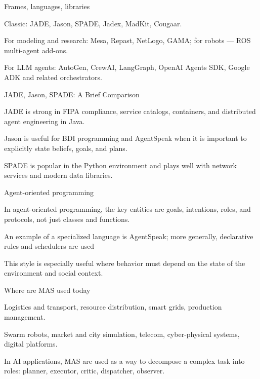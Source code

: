 \begin{frame}{Frames, languages, libraries}
	\topline
	\justifying
	\begin{textitemize}
		\item Classic: JADE, Jason, SPADE, Jadex, MadKit, Cougaar.
		\item For modeling and research: Mesa, Repast, NetLogo, GAMA; for robots --- ROS multi-agent add-ons.
		\item For LLM agents: AutoGen, CrewAI, LangGraph, OpenAI Agents SDK, Google ADK and related orchestrators.
	\end{textitemize}
\end{frame}

\begin{frame}{JADE, Jason, SPADE: A Brief Comparison}
	\topline
	\justifying
	\begin{textitemize}
		\item JADE is strong in FIPA compliance, service catalogs, containers, and distributed agent engineering in Java.
		\item Jason is useful for BDI programming and AgentSpeak when it is important to explicitly state beliefs, goals, and plans.
		\item SPADE is popular in the Python environment and plays well with network services and modern data libraries.
	\end{textitemize}
\end{frame}

\begin{frame}{Agent-oriented programming}
	\topline
	\justifying
	\begin{textitemize}
		\item In agent-oriented programming, the key entities are goals, intentions, roles, and protocols, not just classes and functions.
		\item An example of a specialized language is AgentSpeak; more generally, declarative rules and schedulers are used
		\item This style is especially useful where behavior must depend on the state of the environment and social context.
	\end{textitemize}
\end{frame}

\begin{frame}{Where are MAS used today}
	\topline
	\justifying
	\begin{textitemize}
		\item Logistics and transport, resource distribution, smart grids, production management.
		\item Swarm robots, market and city simulation, telecom, cyber-physical systems, digital platforms.
		\item In AI applications, MAS are used as a way to decompose a complex task into roles: planner, executor, critic, dispatcher, observer.
	\end{textitemize}
\end{frame}

